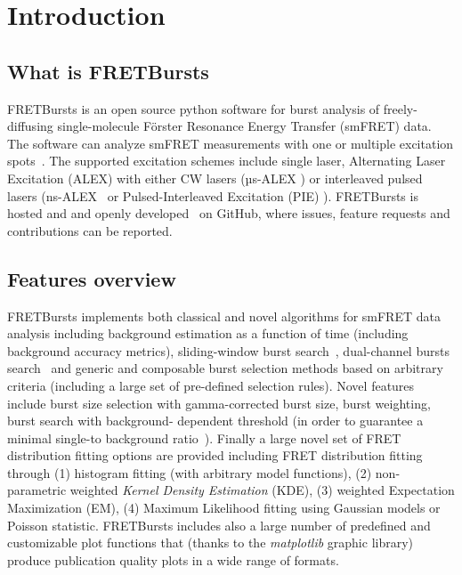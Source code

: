 \section{Introduction}

\subsection{What is FRETBursts}

FRETBursts is an open source python software for burst analysis of freely-diffusing 
single-molecule Förster Resonance Energy Transfer (smFRET) data. 
The software can analyze smFRET measurements
with one or multiple excitation spots~\cite{Ingargiola_2013}. The supported 
excitation schemes include single laser, Alternating Laser Excitation (ALEX) 
with either CW lasers (µs-ALEX \cite{Kapanidis_2005}) 
or interleaved pulsed lasers (ns-ALEX~\cite{Laurence_2005} or 
Pulsed-Interleaved Excitation (PIE) \cite{M_ller_2005}). 
FRETBursts is hosted and and openly developed~\cite{Prli__2012} on GitHub, where
issues, feature requests and contributions can be reported.

\subsection{Features overview}

FRETBursts implements both classical and novel algorithms for smFRET data analysis 
including background estimation as a function of time (including background accuracy 
metrics), sliding-window burst search~\cite{Eggeling_1998}, dual-channel bursts search~\cite{Nir_2006} and
generic and composable burst selection methods based on arbitrary criteria 
(including a large set of pre-defined selection rules). Novel features include burst size
selection with gamma-corrected burst size, burst weighting, burst search with background-
dependent threshold (in order to guarantee a minimal single-to background ratio~\cite{Michalet_2012}).
Finally a large novel set of FRET distribution fitting options are provided including
FRET distribution fitting through (1) histogram fitting (with arbitrary model functions), 
(2)  non-parametric weighted \textit{Kernel Density Estimation} (KDE), (3) weighted 
Expectation Maximization (EM), (4) Maximum Likelihood fitting using Gaussian models 
or Poisson statistic. FRETBursts includes also a large number of
predefined and customizable plot functions that (thanks to the \textit{matplotlib} 
graphic library) produce publication quality plots in a wide range of formats.

